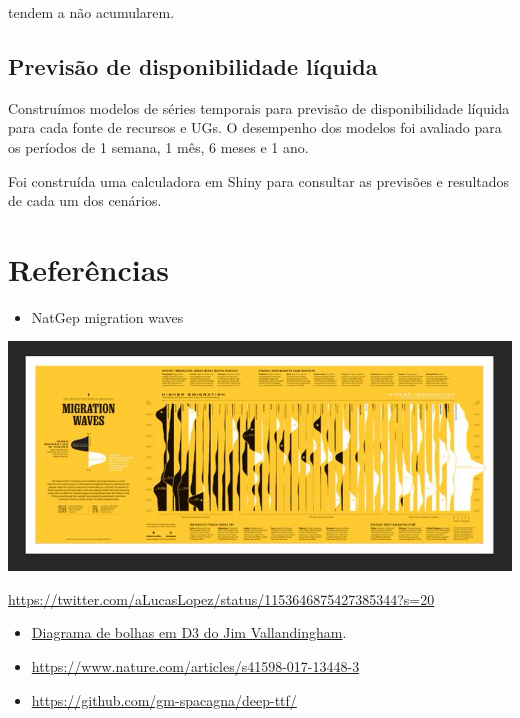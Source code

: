 \documentclass[]{book}
\providecommand{\tightlist}{%
  \setlength{\itemsep}{0pt}\setlength{\parskip}{0pt}}
\begin{document}
tendem a não acumularem.

\hypertarget{previsao-de-disponibilidade-liquida}{%
\section{Previsão de disponibilidade líquida}\label{previsao-de-disponibilidade-liquida}}

Construímos modelos de séries temporais para previsão de disponibilidade líquida para cada fonte de recursos e UGs.
O desempenho dos modelos foi avaliado para os períodos de 1 semana, 1 mês, 6 meses e 1 ano.

Foi construída uma calculadora em Shiny para consultar as previsões e resultados de cada um dos cenários.

\hypertarget{referencias}{%
\chapter*{Referências}\label{referencias}}

\begin{itemize}
\tightlist
\item
  NatGep migration waves
\end{itemize}

\includegraphics{natgeo.jpg}

\url{https://twitter.com/aLucasLopez/status/1153646875427385344?s=20}

\begin{itemize}
\item
  \href{https://vallandingham.me/bubble_charts_with_d3v4.html}{Diagrama de bolhas em D3 do Jim Vallandingham}.
\item
  \url{https://www.nature.com/articles/s41598-017-13448-3}
\item
  \url{https://github.com/gm-spacagna/deep-ttf/}
\end{itemize}


\end{document}
